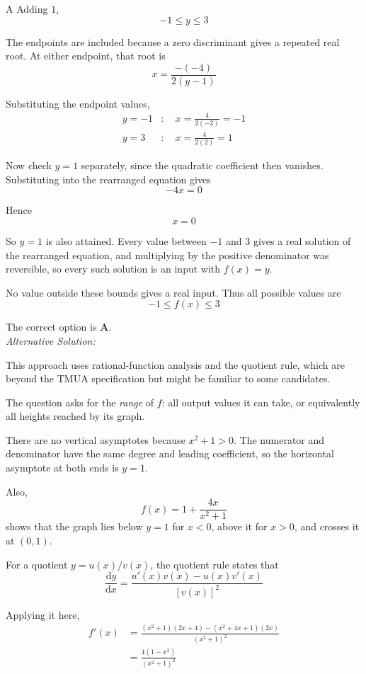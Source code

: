 \documentclass[11pt,a4paper]{article}
\begin{document}
\begin{enumerate}[label=\textbf{\arabic*.},leftmargin=*,itemsep=0pt,start=12]
\begin{djsSolution}{A}
Adding $1$,
\[
-1\le y\le3
\]

The endpoints are included because a zero discriminant gives a repeated real root. At either endpoint, that root is
\[
x=\frac{-(-4)}{2(y-1)}
\]

Substituting the endpoint values,
\[
\begin{aligned}
y=-1 &: \quad x=\frac{4}{2(-2)}=-1\\[8pt]
y=3 &: \quad x=\frac{4}{2(2)}=1
\end{aligned}
\]

Now check $y=1$ separately, since the quadratic coefficient then vanishes. Substituting into the rearranged equation gives
\[
-4x=0
\]

Hence
\[
x=0
\]

So $y=1$ is also attained. Every value between $-1$ and $3$ gives a real solution of the rearranged equation, and multiplying by the positive denominator was reversible, so every such solution is an input with $f(x)=y$.

No value outside these bounds gives a real input. Thus all possible values are
\[
-1\le f(x)\le3
\]

The correct option is \textbf{A}.\\[5pt]

\textit{Alternative Solution:}

This approach uses rational-function analysis and the quotient rule, which are beyond the TMUA specification but might be familiar to some candidates. 

The question asks for the \emph{range} of $f$: all output values it can take, or equivalently all heights reached by its graph.

There are no vertical asymptotes because $x^2+1>0$. The numerator and denominator have the same degree and leading coefficient, so the horizontal asymptote at both ends is $y=1$.

Also,
\[
f(x)=1+\frac{4x}{x^2+1}
\]
shows that the graph lies below $y=1$ for $x<0$, above it for $x>0$, and crosses it at $(0,1)$.

For a quotient $y= u(x)/v(x)$, the quotient rule states that
\[
\frac{\mathrm{d}y}{\mathrm{d}x}
=\frac{u'(x)v(x)-u(x)v'(x)}{[v(x)]^2}
\]

Applying it here,
\[
\begin{aligned}
f'(x)
&=\frac{(x^2+1)(2x+4)-(x^2+4x+1)(2x)}{(x^2+1)^2}\\[8pt]
&=\frac{4(1-x^2)}{(x^2+1)^2}
\end{aligned}
\]


\end{djsSolution}
\end{enumerate}
\end{document}

